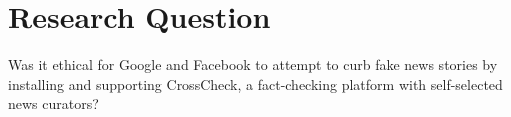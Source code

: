 
\section{Research Question}


Was it ethical for Google and Facebook to attempt to curb fake news stories by installing and supporting CrossCheck, a fact-checking platform with self-selected news curators?